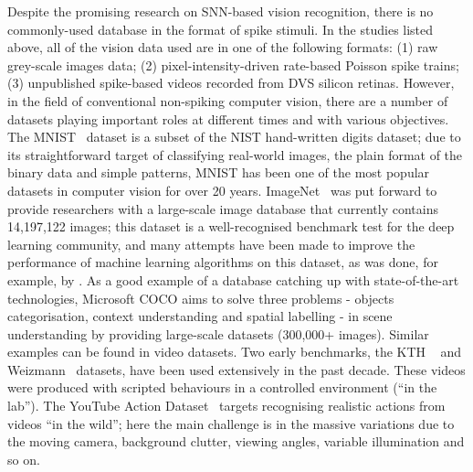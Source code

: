 \documentclass{frontiersENG} %
\begin{document}
Despite the promising research on SNN-based vision recognition, there is no commonly-used database in the format of spike stimuli.
In the studies listed above, all of the vision data used are in one of the following formats:
(1) raw grey-scale images data;
(2) pixel-intensity-driven rate-based Poisson spike trains;
(3) unpublished spike-based videos recorded from DVS silicon retinas.
However, in the field of conventional non-spiking computer vision, there are a number of datasets playing important roles at different times and with various objectives.
The MNIST~\citep{lecun1998gradient} dataset is a subset of the NIST hand-written digits dataset; due to its straightforward target of classifying real-world images, the plain format of the binary data and simple patterns, MNIST has been one of the most popular datasets in computer vision for over 20 years.
ImageNet~\citep{deng2009imagenet} was put forward to provide researchers with a large-scale image database that currently contains 14,197,122 images;
this dataset is a well-recognised benchmark test for the deep learning community, and many attempts have been made to improve the performance of machine learning algorithms on this dataset, as was done, for example, by \citet{krizhevsky2012imagenet}.
As a good example of a database catching up with state-of-the-art technologies, Microsoft COCO aims to solve three problems - objects categorisation, context understanding and spatial labelling - in scene understanding by providing large-scale datasets (300,000+ images).
Similar examples can be found in video datasets.
Two early benchmarks, the KTH ~\citep{schuldt2004recognizing} and Weizmann~\citep{blank2005actions} datasets, have been used extensively in the past decade. 
These videos were produced with scripted behaviours in a controlled environment (``in the lab'').
The YouTube Action Dataset~\citep{liu2009recognizing} targets recognising realistic actions from videos ``in the wild'';
here the main challenge is in the massive variations due to the moving camera, background clutter, viewing angles, variable illumination and so on.
\end{document}
